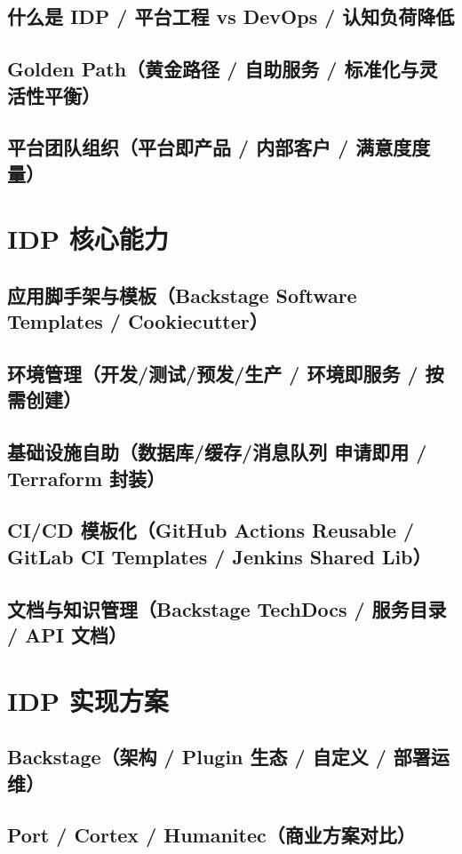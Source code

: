 \documentclass[12pt,UTF8]{ctexbook}
\begin{document}
    \subsection{什么是 IDP / 平台工程 vs DevOps / 认知负荷降低}
    \subsection{Golden Path（黄金路径 / 自助服务 / 标准化与灵活性平衡）}
    \subsection{平台团队组织（平台即产品 / 内部客户 / 满意度度量）}

  \section{IDP 核心能力}
    \subsection{应用脚手架与模板（Backstage Software Templates / Cookiecutter）}
    \subsection{环境管理（开发/测试/预发/生产 / 环境即服务 / 按需创建）}
    \subsection{基础设施自助（数据库/缓存/消息队列 申请即用 / Terraform 封装）}
    \subsection{CI/CD 模板化（GitHub Actions Reusable / GitLab CI Templates / Jenkins Shared Lib）}
    \subsection{文档与知识管理（Backstage TechDocs / 服务目录 / API 文档）}

  \section{IDP 实现方案}
    \subsection{Backstage（架构 / Plugin 生态 / 自定义 / 部署运维）}
    \subsection{Port / Cortex / Humanitec（商业方案对比）}
\end{document}

